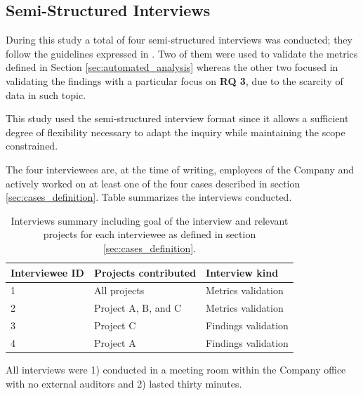 \subsection{Semi-Structured Interviews} \label{sec:semi-structured_interviews}
During this study a total of four semi-structured interviews was conducted; they follow the guidelines expressed in \cite{interview_guideline}. Two of them were used to validate the metrics defined in Section \ref{sec:automated_analysis} whereas the other two focused in validating the findings with a particular focus on \textbf{RQ 3}, due to the scarcity of data in such topic.



This study used the semi-structured interview format since it allows a sufficient degree of flexibility necessary to adapt the inquiry while maintaining the scope constrained.

The four interviewees are, at the time of writing, employees of the Company and actively worked on at least one of the four cases described in section \ref{sec:cases_definition}. Table summarizes the interviews conducted.

\begin{table}[!htb]
	\centering
	\tabulinesep=1.2mm
	\begin{tabu} to \textwidth {|X|X|X|}
		
		\hline
		\textbf{Interviewee ID} & \textbf{Projects contributed} & \textbf{Interview kind} \\ 
		\hline
		
		1 & All projects & Metrics validation \\
		\hline
		
		2 & Project A, B, and C & Metrics validation \\
		\hline
		
		3 & Project C & Findings validation \\
		\hline
		
		4 & Project A & Findings validation \\
		\hline		
		
	\end{tabu}
	\label{tab:interviews_summary}
	\caption[Summary of conducted interviews]{Interviews summary including goal of the interview and relevant projects for each interviewee as defined in section \ref{sec:cases_definition}.}
\end{table}

All interviews were 1) conducted in a meeting room within the Company office with no external auditors and 2) lasted thirty minutes.






